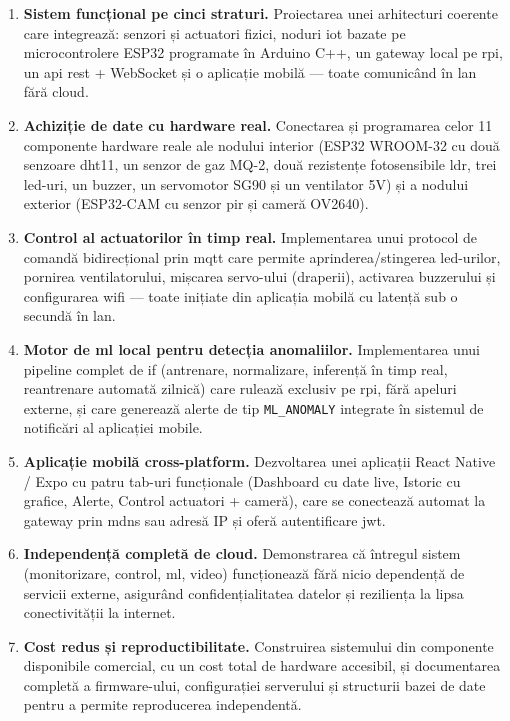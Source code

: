\begin{enumerate}
  \item \textbf{Sistem funcțional pe cinci straturi.}
  Proiectarea unei arhitecturi coerente care integrează: senzori și actuatori
  fizici, noduri \gls{iot} bazate pe microcontrolere ESP32 programate în
  Arduino C++, un gateway local pe \gls{rpi}, un \gls{api} \gls{rest} +
  WebSocket și o aplicație mobilă — toate comunicând în \gls{lan} fără cloud.

  \item \textbf{Achiziție de date cu hardware real.}
  Conectarea și programarea celor 11 componente hardware reale ale nodului
  interior (ESP32 WROOM-32 cu două senzoare \gls{dht}11, un senzor de gaz
  MQ-2, două rezistențe fotosensibile \gls{ldr}, trei \gls{led}-uri, un
  buzzer, un servomotor SG90 și un ventilator 5V) și a nodului exterior
  (ESP32-CAM cu senzor \gls{pir} și cameră OV2640).

  \item \textbf{Control al actuatorilor în timp real.}
  Implementarea unui protocol de comandă bidirecțional prin \gls{mqtt} care
  permite aprinderea/stingerea \gls{led}-urilor, pornirea ventilatorului,
  mișcarea servo-ului (draperii), activarea buzzerului și configurarea \gls{wifi}
  — toate inițiate din aplicația mobilă cu latență sub o secundă în \gls{lan}.

  \item \textbf{Motor de \gls{ml} local pentru detecția anomaliilor.}
  Implementarea unui pipeline complet de \gls{if} (antrenare, normalizare,
  inferență în timp real, reantrenare automată zilnică) care rulează exclusiv
  pe \gls{rpi}, fără apeluri externe, și care generează alerte de tip
  \texttt{ML\_ANOMALY} integrate în sistemul de notificări al aplicației mobile.

  \item \textbf{Aplicație mobilă cross-platform.}
  Dezvoltarea unei aplicații React Native / Expo cu patru tab-uri funcționale
  (Dashboard cu date live, Istoric cu grafice, Alerte, Control actuatori +
  cameră), care se conectează automat la gateway prin \gls{mdns} sau adresă IP
  și oferă autentificare \gls{jwt}.

  \item \textbf{Independență completă de cloud.}
  Demonstrarea că întregul sistem (monitorizare, control, \gls{ml}, video)
  funcționează fără nicio dependență de servicii externe, asigurând
  confidențialitatea datelor și reziliența la lipsa conectivității la internet.

  \item \textbf{Cost redus și reproductibilitate.}
  Construirea sistemului din componente disponibile comercial, cu un cost total
  de hardware accesibil, și documentarea completă a firmware-ului, configurației
  serverului și structurii bazei de date pentru a permite reproducerea independentă.
\end{enumerate}

